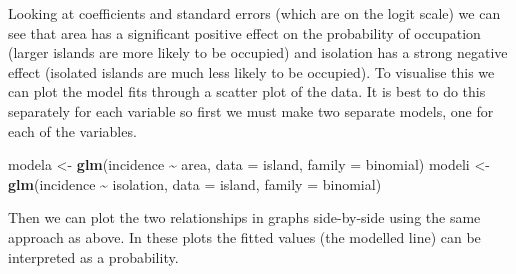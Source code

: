 \documentclass[
  a4paperpaper,
]{book}
\newenvironment{Shaded}{\begin{snugshade}}{\end{snugshade}}
\newcommand{\DataTypeTok}[1]{\textcolor[rgb]{0.13,0.29,0.53}{#1}}
\newcommand{\DecValTok}[1]{\textcolor[rgb]{0.00,0.00,0.81}{#1}}
\newcommand{\FloatTok}[1]{\textcolor[rgb]{0.00,0.00,0.81}{#1}}
\newcommand{\KeywordTok}[1]{\textcolor[rgb]{0.13,0.29,0.53}{\textbf{#1}}}
\newcommand{\NormalTok}[1]{#1}
\newcommand{\OperatorTok}[1]{\textcolor[rgb]{0.81,0.36,0.00}{\textbf{#1}}}
\newcommand{\StringTok}[1]{\textcolor[rgb]{0.31,0.60,0.02}{#1}}
\begin{document}
Looking at coefficients and standard errors (which are on the logit scale) we can see that area has a significant positive effect on the probability of occupation (larger islands are more likely to be occupied) and isolation has a strong negative effect (isolated islands are much less likely to be occupied). To visualise this we can plot the model fits through a scatter plot of the data. It is best to do this separately for each variable so first we must make two separate models, one for each of the variables.

\begin{Shaded}
\begin{Highlighting}[]
\NormalTok{modela \textless{}{-}}\StringTok{ }\KeywordTok{glm}\NormalTok{(incidence }\OperatorTok{\textasciitilde{}}\StringTok{ }\NormalTok{area, }\DataTypeTok{data =}\NormalTok{ island, }\DataTypeTok{family =}\NormalTok{ binomial)}
\NormalTok{modeli \textless{}{-}}\StringTok{ }\KeywordTok{glm}\NormalTok{(incidence }\OperatorTok{\textasciitilde{}}\StringTok{ }\NormalTok{isolation, }\DataTypeTok{data =}\NormalTok{ island, }\DataTypeTok{family =}\NormalTok{ binomial)}
\end{Highlighting}
\end{Shaded}

Then we can plot the two relationships in graphs side-by-side using the same approach as above. In these plots the fitted values (the modelled line) can be interpreted as a probability.

\begin{Shaded}
\end{Shaded}
\end{document}
